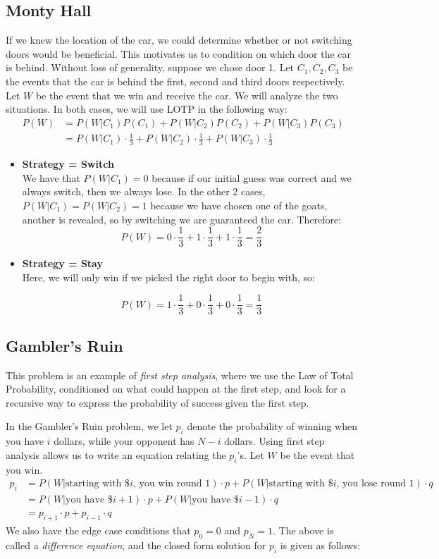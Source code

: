 \documentclass[11pt]{article}
\begin{document}
\begin{notes}
\subsection*{Monty Hall}
If we knew the location of the car, we could determine whether or not switching doors would be beneficial. This motivates us to condition on which door the car is behind. Without loss of generality, suppose we chose door 1. Let $C_1, C_2, C_3$ be the events that the car is behind the first, second and third doors respectively. Let $W$ be the event that we win and receive the car. We will analyze the two situations. In both cases, we will use LOTP in the following way: 
\begin{align*}
P(W) &= P(W | C_1) P(C_1) + P(W | C_2) P(C_2) + P(W | C_3 ) P(C_3) \\ 
&= P(W | C_1) \cdot \frac{1}{3} + P(W | C_2) \cdot \frac{1}{3} + P(W | C_3) \cdot \frac{1}{3}
\end{align*} 
\begin{itemize}
\item \textbf{Strategy = Switch}\\
We have that $P(W | C_1) = 0$ because if our initial guess was correct and we always switch, then we always lose. In the other 2 cases, $P(W | C_1) = P(W | C_2) = 1$ because we have chosen one of the goats, another is revealed, so by switching we are guaranteed the car. Therefore: 
$$P(W) = 0 \cdot \frac{1}{3} +  1 \cdot \frac{1}{3} +  1 \cdot \frac{1}{3} = \boxed{\frac{2}{3}}$$
\item \textbf{Strategy = Stay}\\
Here, we will only win if we picked the right door to begin with, so: 

$$P(W) = 1 \cdot \frac{1}{3} +  0 \cdot \frac{1}{3} +  0 \cdot \frac{1}{3} = \boxed{\frac{1}{3}}$$
\end{itemize}

\subsection*{Gambler's Ruin}
This problem is an example of \textit{first step analysis}, where we use the Law of Total Probability, conditioned on what could happen at the first step, and look for a recursive way to express the probability of success given the first step. 

In the Gambler's Ruin problem, we let $p_i$ denote the probability of winning when you have $i$ dollars, while your opponent has $N-i$ dollars. Using first step analysis allows us to write an equation relating the $p_i$'s. Let $W$ be the event that you win. 
\begin{align*}
p_i &= P(W | \text{starting with \$$i$, you win round 1}) \cdot p + P(W | \text{starting with \$$i$, you lose round 1}) \cdot q \\ 
&= P(W | \text{you have \$$i+1$}) \cdot p + P(W | \text{you have \$ $i-1$}) \cdot q \\ 
&= p_{i+1} \cdot p + p_{i-1} \cdot q
\end{align*}
We also have the edge case conditions that $p_0 = 0$ and $p_N = 1$. The above is called a \textit{difference equation}, and the closed form solution for $p_i$ is given as follows: 


\end{notes}
\end{document}
